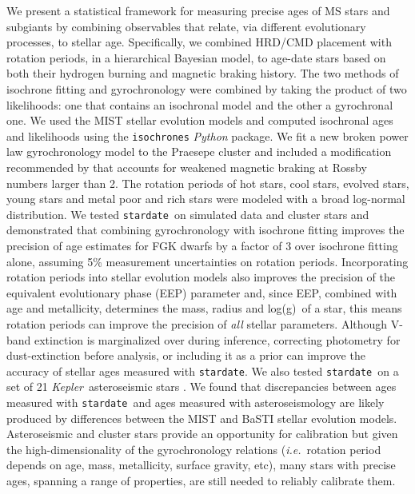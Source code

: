 \documentclass[useAMS, usenatbib, preprint, 12pt]{aastex}
\newcommand{\ie}{{\it i.e.}}
\newcommand{\kepler}{{\it Kepler}}
\newcommand{\logg}{log(g)}
\newcommand{\sd}{{\tt stardate}}
\newcommand{\racomment}[1]{{\bf #1}}
\begin{document}
We present a statistical framework for measuring precise ages of MS stars and
subgiants by combining observables that relate, via different evolutionary
processes, to stellar age.
Specifically, we combined HRD/CMD placement with rotation periods, in a
hierarchical Bayesian model, to age-date stars based on both their hydrogen
burning and magnetic braking history.
The two methods of isochrone fitting and gyrochronology were combined by
taking the product of two likelihoods: one that contains an isochronal model
and the other a gyrochronal one.
We used the MIST stellar evolution models and computed isochronal ages and
likelihoods using the {\tt isochrones} {\it Python} package.
We fit a new broken power law gyrochronology model to the Praesepe cluster
and included a modification recommended by \citet{vansaders2016} that accounts
for weakened magnetic braking at Rossby numbers larger than 2.
The rotation periods of hot stars, cool stars, evolved stars, young stars and
metal poor and rich stars were modeled with a broad log-normal distribution.
We tested \sd\ on simulated data and cluster stars and demonstrated that
combining gyrochronology with isochrone fitting improves the precision of age
estimates for FGK dwarfs by a factor of 3 over isochrone fitting alone,
assuming 5\% measurement uncertainties on rotation periods.
Incorporating rotation periods into stellar evolution models also improves the
precision of the equivalent evolutionary phase (EEP) parameter and, since EEP,
combined with age and metallicity, determines the mass, radius and \logg\ of a
star, this means rotation periods can improve the precision of {\it all}
stellar parameters.
Although V-band extinction is marginalized over during inference, correcting
photometry for dust-extinction before analysis, or including it as a
prior can improve the accuracy of stellar ages measured with \sd.
We also tested \sd\ on a set of 21 \kepler\ asteroseismic stars
\citep{vansaders2016}.
We found that discrepancies between ages measured with \sd\ and ages measured
with asteroseismology are likely produced by differences between the MIST and
BaSTI stellar evolution models.
Asteroseismic and cluster stars provide an opportunity for calibration but
given the high-dimensionality of the gyrochronology relations (\ie\ rotation
period depends on age, mass, metallicity, surface gravity, etc), many stars
with precise ages, spanning a range of properties, are still needed to
reliably calibrate them.
\end{document}

